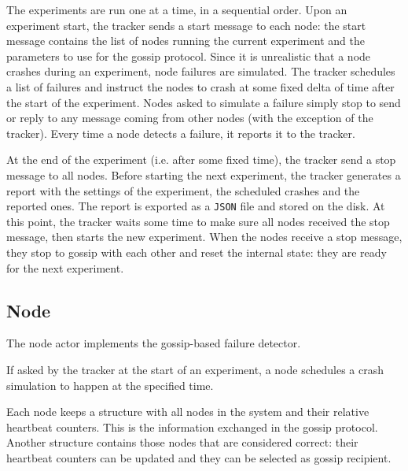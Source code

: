 The experiments are run one at a time, in a sequential order.
Upon an experiment start, the tracker sends a start message to each node:
the start message contains the list of nodes running the current experiment and the parameters to use for the gossip protocol.
Since it is unrealistic that a node crashes during an experiment, node failures are simulated.
The tracker schedules a list of failures and instruct the nodes to crash at some fixed delta of time after the start of the experiment.
Nodes asked to simulate a failure simply stop to send or reply to any message coming from other nodes (with the exception of the tracker).
Every time a node detects a failure, it reports it to the tracker.

At the end of the experiment (i.e. after some fixed time), the tracker send a stop message to all nodes.
Before starting the next experiment, the tracker generates a report with the settings of the experiment, the scheduled crashes and the reported ones.
The report is exported as a \texttt{JSON} file and stored on the disk.
At this point, the tracker waits some time to make sure all nodes received the stop message, then starts the new experiment.
When the nodes receive a stop message, they stop to gossip with each other and reset the internal state: they are ready for the next experiment.


\subsection{Node}
The node actor implements the gossip-based failure detector.

If asked by the tracker at the start of an experiment, a node schedules a crash simulation to happen at the specified time.

Each node keeps a structure with all nodes in the system and their relative heartbeat counters.
This is the information exchanged in the gossip protocol.
Another structure contains those nodes that are considered correct:
their heartbeat counters can be updated and they can be selected as gossip recipient.

